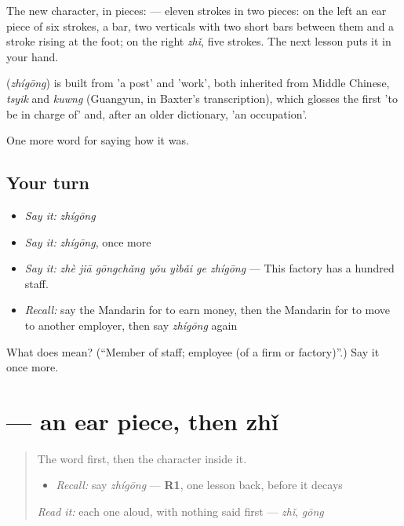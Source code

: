 The new character, in pieces:  — eleven strokes in two pieces: on the left an ear piece of six strokes, a bar, two verticals with two short bars between them and a stroke rising at the foot; on the right  \emph{zhǐ}, five strokes. The next lesson puts it in your hand.

\begin{cousinweb}
\textbf{} (\emph{zhígōng}) is built from  'a post' and  'work', both inherited from Middle Chinese, \emph{tsyik} and \emph{kuwng} (Guangyun, in Baxter's transcription), which glosses the first 'to be in charge of' and, after an older dictionary, 'an occupation'.
\end{cousinweb}

\begin{grammarlens}[title={What you've built}]
One more word for saying how it was.
\end{grammarlens}

\subsection*{Your turn}
\begin{itemize}
\raggedright
  \item \emph{Say it:} \emph{zhígōng}
  \item \emph{Say it:} \emph{zhígōng}, once more
  \item \emph{Say it:} \emph{zhè jiā gōngchǎng yǒu yìbǎi ge zhígōng} — This factory has a hundred staff.
  \item \emph{Recall:} say the Mandarin for to earn money, then the Mandarin for to move to another employer, then say \emph{zhígōng} again
\end{itemize}

\begin{tcolorbox}[breakable,colback=teal!4,colframe=teal!35!black,title={Before you move on}]
What does  mean? (\textquotedblleft{}Member of staff; employee (of a firm or factory)\textquotedblright{}.) Say it once more.
\end{tcolorbox}
\section[\texorpdfstring{\zh{职} (zhí)}{职 (zhí)}]{ — an ear piece, then zhǐ}

\label{lesson:ZH-W489-zhi-post}



\begin{quote}
The word first, then the character inside it.

\begin{itemize}
\raggedright
  \item \emph{Recall:} say \emph{zhígōng} — \textbf{R1}, one lesson back, before it decays
\end{itemize}

\begin{quote}
 
\end{quote}

\emph{Read it:} each one aloud, with nothing said first — \emph{zhǐ}, \emph{gōng}
\end{quote}

